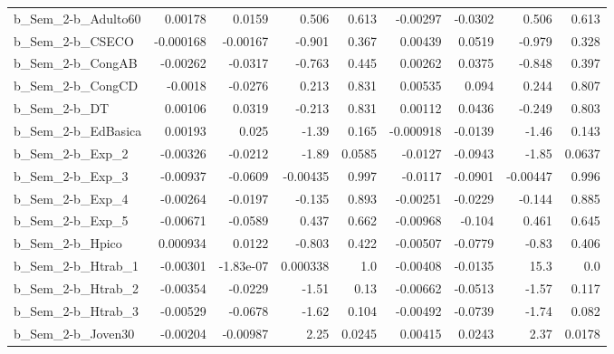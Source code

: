 \begin{tabular}{lrrrrrrrr}
b\_Sem\_2-b\_Adulto60         &     0.00178 &       0.0159 &     0.506 &    0.613 &   -0.00297 &     -0.0302 &        0.506 &         0.613 \\
b\_Sem\_2-b\_CSECO            &   -0.000168 &     -0.00167 &    -0.901 &    0.367 &    0.00439 &      0.0519 &       -0.979 &         0.328 \\
b\_Sem\_2-b\_CongAB           &    -0.00262 &      -0.0317 &    -0.763 &    0.445 &    0.00262 &      0.0375 &       -0.848 &         0.397 \\
b\_Sem\_2-b\_CongCD           &     -0.0018 &      -0.0276 &     0.213 &    0.831 &    0.00535 &       0.094 &        0.244 &         0.807 \\
b\_Sem\_2-b\_DT               &     0.00106 &       0.0319 &    -0.213 &    0.831 &    0.00112 &      0.0436 &       -0.249 &         0.803 \\
b\_Sem\_2-b\_EdBasica         &     0.00193 &        0.025 &     -1.39 &    0.165 &  -0.000918 &     -0.0139 &        -1.46 &         0.143 \\
b\_Sem\_2-b\_Exp\_2            &    -0.00326 &      -0.0212 &     -1.89 &   0.0585 &    -0.0127 &     -0.0943 &        -1.85 &        0.0637 \\
b\_Sem\_2-b\_Exp\_3            &    -0.00937 &      -0.0609 &  -0.00435 &    0.997 &    -0.0117 &     -0.0901 &     -0.00447 &         0.996 \\
b\_Sem\_2-b\_Exp\_4            &    -0.00264 &      -0.0197 &    -0.135 &    0.893 &   -0.00251 &     -0.0229 &       -0.144 &         0.885 \\
b\_Sem\_2-b\_Exp\_5            &    -0.00671 &      -0.0589 &     0.437 &    0.662 &   -0.00968 &      -0.104 &        0.461 &         0.645 \\
b\_Sem\_2-b\_Hpico            &    0.000934 &       0.0122 &    -0.803 &    0.422 &   -0.00507 &     -0.0779 &        -0.83 &         0.406 \\
b\_Sem\_2-b\_Htrab\_1          &    -0.00301 &    -1.83e-07 &  0.000338 &      1.0 &   -0.00408 &     -0.0135 &         15.3 &           0.0 \\
b\_Sem\_2-b\_Htrab\_2          &    -0.00354 &      -0.0229 &     -1.51 &     0.13 &   -0.00662 &     -0.0513 &        -1.57 &         0.117 \\
b\_Sem\_2-b\_Htrab\_3          &    -0.00529 &      -0.0678 &     -1.62 &    0.104 &   -0.00492 &     -0.0739 &        -1.74 &         0.082 \\
b\_Sem\_2-b\_Joven30          &    -0.00204 &     -0.00987 &      2.25 &   0.0245 &    0.00415 &      0.0243 &         2.37 &        0.0178 \\

\end{tabular}
